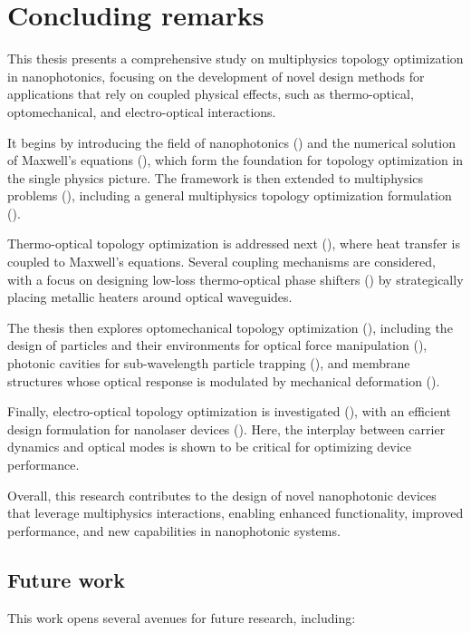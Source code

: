 \chapter{Concluding remarks}

This thesis presents a comprehensive study on multiphysics topology optimization in nanophotonics, focusing on the development of novel design methods for applications that rely on coupled physical effects, such as thermo-optical, optomechanical, and electro-optical interactions.

It begins by introducing the field of nanophotonics () and the numerical solution of Maxwell's equations (), which form the foundation for topology optimization in the single physics picture. The framework is then extended to multiphysics problems (), including a general multiphysics topology optimization formulation ().

Thermo-optical topology optimization is addressed next (), where heat transfer is coupled to Maxwell's equations. Several coupling mechanisms are considered, with a focus on designing low-loss thermo-optical phase shifters () by strategically placing metallic heaters around optical waveguides.

The thesis then explores optomechanical topology optimization (), including the design of particles and their environments for optical force manipulation (), photonic cavities for sub-wavelength particle trapping (), and membrane structures whose optical response is modulated by mechanical deformation ().

Finally, electro-optical topology optimization is investigated (), with an efficient design formulation for nanolaser devices (). Here, the interplay between carrier dynamics and optical modes is shown to be critical for optimizing device performance. 

Overall, this research contributes to the design of novel nanophotonic devices that leverage multiphysics interactions, enabling enhanced functionality, improved performance, and new capabilities in nanophotonic systems.
\section{Future work}

This work opens several avenues for future research, including:

